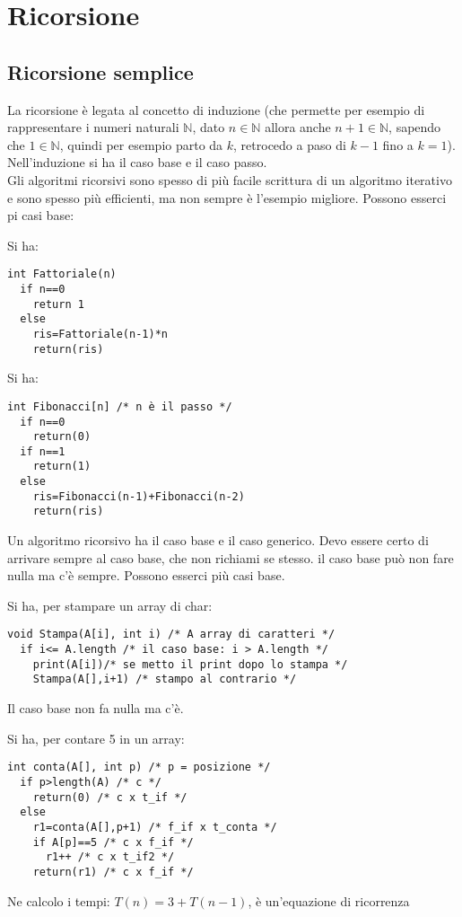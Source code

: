 \documentclass[a4paper,12pt,oneside,tikz]{book}
\begin{document}
\chapter{Ricorsione}
\section{Ricorsione semplice}
La ricorsione è legata al concetto di induzione (che permette per esempio di rappresentare i numeri naturali $ \mathbb{N}$, dato $n\in\mathbb{N}$ allora anche $n+1\in\mathbb{N}$, sapendo che $1\in\mathbb{N}$, quindi per esempio parto da $k$, retrocedo a paso di $k-1$ fino a $k=1$). Nell'induzione si ha il caso base e il caso passo. \\
Gli algoritmi ricorsivi sono spesso di più facile scrittura di un algoritmo iterativo e sono spesso più efficienti, ma non sempre è l'esempio migliore. Possono esserci pi casi base:
\begin{esempio}[Fattoriale]
Si ha:
\begin{verbatim}
int Fattoriale(n)
  if n==0
    return 1
  else 
    ris=Fattoriale(n-1)*n
    return(ris)
\end{verbatim}
\end{esempio}
\newpage
\begin{esempio}[Fibonacci]
Si ha:
\begin{verbatim}
int Fibonacci[n] /* n è il passo */
  if n==0
    return(0)
  if n==1
    return(1)
  else 
    ris=Fibonacci(n-1)+Fibonacci(n-2)
    return(ris)
\end{verbatim}
\end{esempio}
Un algoritmo ricorsivo ha il caso base e il caso generico. Devo essere certo di arrivare sempre al caso base, che non richiami se stesso. il caso base può non fare nulla ma c'è sempre. Possono esserci più casi base.
\begin{esempio}
Si ha, per stampare un array di char:
\begin{verbatim}
void Stampa(A[i], int i) /* A array di caratteri */
  if i<= A.length /* il caso base: i > A.length */
    print(A[i])/* se metto il print dopo lo stampa */
    Stampa(A[],i+1) /* stampo al contrario */
\end{verbatim}
Il caso base non fa nulla ma c'è.
\end{esempio}
\begin{esempio}
Si ha, per contare 5 in un array:
\begin{verbatim}
int conta(A[], int p) /* p = posizione */
  if p>length(A) /* c */
    return(0) /* c x t_if */
  else
    r1=conta(A[],p+1) /* f_if x t_conta */
    if A[p]==5 /* c x f_if */
      r1++ /* c x t_if2 */
    return(r1) /* c x f_if */
\end{verbatim}
Ne calcolo i tempi:
$T(n)=3+T(n-1)$, è un'equazione di ricorrenza
\end{esempio}
\end{document}
